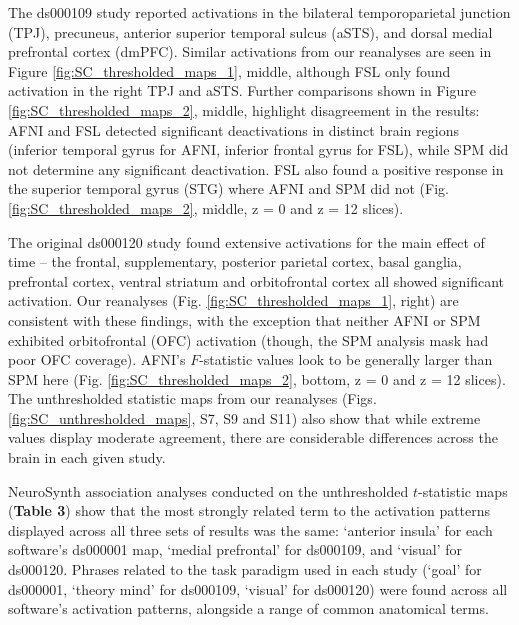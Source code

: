 The ds000109 study reported activations in the bilateral temporoparietal junction (TPJ), precuneus, anterior superior temporal sulcus (aSTS), and dorsal medial prefrontal cortex (dmPFC). Similar activations from our reanalyses are seen in Figure \ref{fig:SC_thresholded_maps_1}, middle, although FSL only found activation in the right TPJ and aSTS. Further comparisons shown in Figure \ref{fig:SC_thresholded_maps_2}, middle, highlight disagreement in the results: AFNI and FSL detected significant deactivations in distinct brain regions (inferior temporal gyrus for AFNI, inferior frontal gyrus for FSL), while SPM did not determine any significant deactivation. FSL also found a positive response in the superior temporal gyrus  (STG) where AFNI and SPM did not (Fig. \ref{fig:SC_thresholded_maps_2}, middle, z = 0 and z = 12 slices).

The original ds000120 study found extensive activations for the main effect of time -- the frontal, supplementary, posterior parietal cortex, basal ganglia, prefrontal cortex, ventral striatum and orbitofrontal cortex all showed significant activation. Our reanalyses (Fig. \ref{fig:SC_thresholded_maps_1}, right) are consistent with these findings, with the exception that neither AFNI or SPM exhibited orbitofrontal (OFC) activation (though, the SPM  analysis mask had poor OFC coverage). AFNI's $F$-statistic values look to be generally larger than SPM here (Fig. \ref{fig:SC_thresholded_maps_2}, bottom, z = 0 and z = 12 slices). The unthresholded statistic maps from our reanalyses (Figs. \ref{fig:SC_unthresholded_maps}, S7, S9 and S11) also show that while extreme values display moderate agreement, there are considerable differences across the brain in each given study.

NeuroSynth association analyses conducted on the unthresholded $t$-statistic maps (\textbf{Table 3}) show that the most strongly related term to the activation patterns displayed across all three sets of results was the same: `anterior insula' for each software's ds000001 map, `medial prefrontal' for ds000109, and `visual' for ds000120. Phrases related to the task paradigm used in each study (`goal' for ds000001, `theory mind' for ds000109, `visual' for ds000120) were found across all software's activation patterns, alongside a range of common anatomical terms. 

